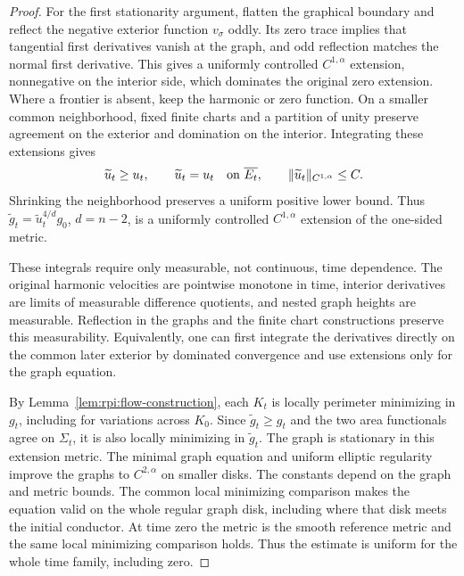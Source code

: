 \begin{proof}
For the first stationarity argument, flatten the graphical boundary and
reflect the negative exterior function $v_\sigma$ oddly. Its zero trace
implies that tangential first derivatives vanish at the graph, and odd
reflection matches the normal first derivative. This gives a uniformly
controlled $C^{1,\alpha}$ extension, nonnegative on the interior side,
which dominates the original zero extension. Where a frontier is
absent, keep the harmonic or zero function. On a smaller common
neighborhood, fixed finite charts and a partition of unity preserve
agreement on the exterior and domination on the interior. Integrating
these extensions gives
\[
 \widetilde u_t\ge u_t,\qquad
 \widetilde u_t=u_t\quad\hbox{on }\overline{E_t},\qquad
 \|\widetilde u_t\|_{C^{1,\alpha}}\le C.
\]
Shrinking the neighborhood preserves a uniform positive lower bound.
Thus $\widetilde g_t=\widetilde u_t^{4/d}g_0$, $d=n-2$, is a
uniformly controlled $C^{1,\alpha}$ extension of the one-sided metric.

These integrals require only measurable, not continuous, time dependence.
The original harmonic velocities are pointwise monotone in time,
interior derivatives are limits of measurable difference quotients,
and nested graph heights are measurable. Reflection in the graphs and
the finite chart constructions preserve this measurability. Equivalently,
one can first integrate the derivatives directly on the common later
exterior by dominated convergence and use extensions only for the graph
equation.

By Lemma~\ref{lem:rpi:flow-construction}, each $K_t$ is locally
perimeter minimizing in $g_t$, including for variations across $K_0$.
Since $\widetilde g_t\ge g_t$ and the two area functionals agree on
$\Sigma_t$, it is also locally minimizing in $\widetilde g_t$.
The graph is stationary in this
extension metric. The minimal graph equation and uniform elliptic
regularity improve the graphs to $C^{2,\alpha}$ on smaller disks.
The constants depend on the graph and metric bounds. The common
local minimizing comparison makes the equation valid on the whole
regular graph disk, including where that disk meets the initial
conductor. At time zero the metric is the smooth reference metric
and the same local minimizing comparison holds. Thus the estimate is uniform for
the whole time family, including zero.


\end{proof}
